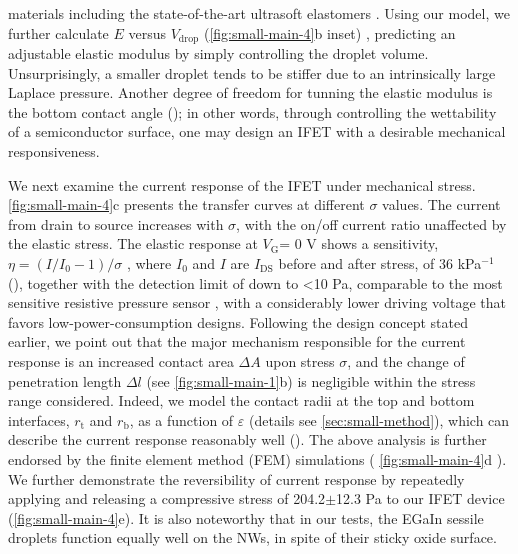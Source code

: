 materials including the state-of-the-art ultrasoft elastomers
\cite{Miriyev_2017_soft_mater,Jang_2015_soft_network}.
%
Using our model, we further calculate \(E\) versus
\(V_{\mathrm{drop}}\) (\autoref{fig:small-main-4}b inset)
, predicting an adjustable elastic modulus by
simply controlling the droplet volume. Unsurprisingly, a smaller
droplet tends to be stiffer due to an intrinsically large Laplace
pressure. Another degree of freedom for tunning the elastic modulus is
the bottom contact angle (); in other words,
through controlling the wettability of a semiconductor surface, one
may design an IFET with a desirable mechanical responsiveness.

We next examine the current response of the IFET under mechanical
stress.  \autoref{fig:small-main-4}c presents the transfer curves at
different \(\sigma\) values. The current from drain to source
increases with \(\sigma\), with the on/off current ratio unaffected by
the elastic stress. The elastic response at \(V_{\mathrm{G}}\)= 0 V
shows a sensitivity, \(\eta = (I/I_{0} - 1) / \sigma\) , where
\(I_{0}\) and \(I\) are \(I_{\mathrm{DS}}\) before and after stress,
of 36 kPa\(^{-1}\) (), together
with the detection limit of down to \textless{}10 Pa, comparable to
the most sensitive resistive pressure sensor
\cite{Mannsfeld_2010_pressure,Pang_2012_gauge,Pan_2014_pressure,Zang_2015_suspend_gate_FET},
with a considerably lower driving voltage that favors
low-power-consumption designs. Following the design concept stated
earlier, we point out that the major mechanism responsible for the
current response is an increased contact area \(\Delta A\)  upon stress \(\sigma\), and the change of penetration length
\(\Delta l\) (see \autoref{fig:small-main-1}b) is negligible within
the stress range considered. Indeed, we model the contact radii at the
top and bottom interfaces, \(r_{\mathrm{t}}\) and \(r_{\mathrm{b}}\),
as a function of \(\varepsilon\) (details see
\autoref{sec:small-method}), which can describe the current response
reasonably well (). The
above analysis is further endorsed by the finite element method (FEM)
simulations ( \autoref{fig:small-main-4}d ).  We further demonstrate the reversibility of
current response by repeatedly applying and releasing a compressive
stress of 204.2\(\pm\)12.3 Pa to our IFET device
(\autoref{fig:small-main-4}e). It is also noteworthy that in our
tests, the EGaIn sessile droplets function equally well on the NWs, in
spite of their sticky oxide surface.

